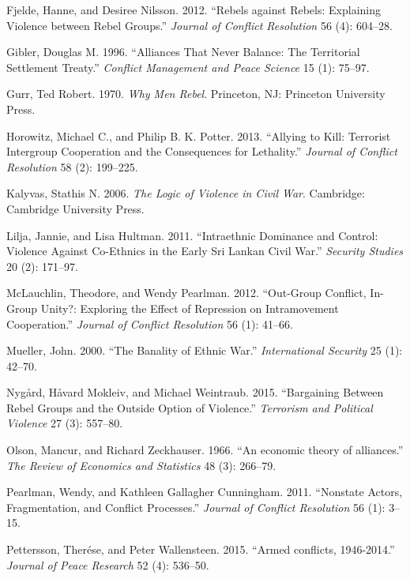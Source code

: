 \documentclass[12pt,]{article}
\begin{document}
\hypertarget{ref-Fjelde2012}{}
Fjelde, Hanne, and Desiree Nilsson. 2012. ``Rebels against Rebels:
Explaining Violence between Rebel Groups.'' \emph{Journal of Conflict
Resolution} 56 (4): 604--28.

\hypertarget{ref-Gibler1996}{}
Gibler, Douglas M. 1996. ``Alliances That Never Balance: The Territorial
Settlement Treaty.'' \emph{Conflict Management and Peace Science} 15
(1): 75--97.

\hypertarget{ref-gurr70}{}
Gurr, Ted Robert. 1970. \emph{Why Men Rebel}. Princeton, NJ: Princeton
University Press.

\hypertarget{ref-Horowitz2013}{}
Horowitz, Michael C., and Philip B. K. Potter. 2013. ``Allying to Kill:
Terrorist Intergroup Cooperation and the Consequences for Lethality.''
\emph{Journal of Conflict Resolution} 58 (2): 199--225.

\hypertarget{ref-Kalyvas2006}{}
Kalyvas, Stathis N. 2006. \emph{The Logic of Violence in Civil War}.
Cambridge: Cambridge University Press.

\hypertarget{ref-Lilja2011}{}
Lilja, Jannie, and Lisa Hultman. 2011. ``Intraethnic Dominance and
Control: Violence Against Co-Ethnics in the Early Sri Lankan Civil
War.'' \emph{Security Studies} 20 (2): 171--97.

\hypertarget{ref-McLauchlin2012}{}
McLauchlin, Theodore, and Wendy Pearlman. 2012. ``Out-Group Conflict,
In-Group Unity?: Exploring the Effect of Repression on Intramovement
Cooperation.'' \emph{Journal of Conflict Resolution} 56 (1): 41--66.

\hypertarget{ref-mueller00}{}
Mueller, John. 2000. ``The Banality of Ethnic War.'' \emph{International
Security} 25 (1): 42--70.

\hypertarget{ref-Nygard2014}{}
Nygård, Håvard Mokleiv, and Michael Weintraub. 2015. ``Bargaining
Between Rebel Groups and the Outside Option of Violence.''
\emph{Terrorism and Political Violence} 27 (3): 557--80.

\hypertarget{ref-Olson1966}{}
Olson, Mancur, and Richard Zeckhauser. 1966. ``An economic theory of
alliances.'' \emph{The Review of Economics and Statistics} 48 (3):
266--79.

\hypertarget{ref-Pearlman2011a}{}
Pearlman, Wendy, and Kathleen Gallagher Cunningham. 2011. ``Nonstate
Actors, Fragmentation, and Conflict Processes.'' \emph{Journal of
Conflict Resolution} 56 (1): 3--15.

\hypertarget{ref-Pettersson2015a}{}
Pettersson, Therése, and Peter Wallensteen. 2015. ``Armed conflicts,
1946-2014.'' \emph{Journal of Peace Research} 52 (4): 536--50.
\end{document}

